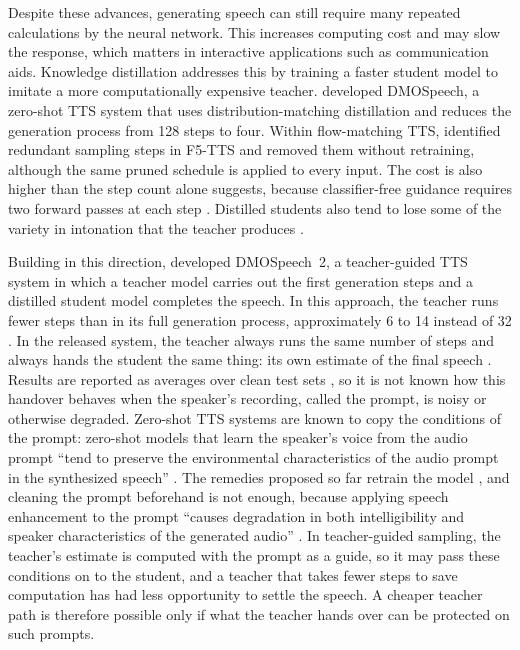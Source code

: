 Despite these advances, generating speech can still require many repeated calculations by the neural network. This increases computing cost and may slow the response, which matters in interactive applications such as communication aids. Knowledge distillation addresses this by training a faster student model to imitate a more computationally expensive teacher. \textcite{li2024dmospeech} developed DMOSpeech, a zero-shot TTS system that uses distribution-matching distillation and reduces the generation process from 128 steps to four. Within flow-matching TTS, \textcite{zheng2025epss} identified redundant sampling steps in F5-TTS and removed them without retraining, although the same pruned schedule is applied to every input. The cost is also higher than the step count alone suggests, because classifier-free guidance requires two forward passes at each step \parencite{ho2022cfg,yang2025shallow}. Distilled students also tend to lose some of the variety in intonation that the teacher produces \parencite[pp.~31817--31818]{li2025dmospeech2}.

Building in this direction, \textcite{li2025dmospeech2} developed DMOSpeech~2, a teacher-guided TTS system in which a teacher model carries out the first generation steps and a distilled student model completes the speech. In this approach, the teacher runs fewer steps than in its full generation process, approximately 6 to 14 instead of 32 \parencite[p.~31818]{li2025dmospeech2}. In the released system, the teacher always runs the same number of steps and always hands the student the same thing: its own estimate of the final speech \parencite{li2025dmospeech2code}. Results are reported as averages over clean test sets \parencite[p.~31819]{li2025dmospeech2}, so it is not known how this handover behaves when the speaker's recording, called the prompt, is noisy or otherwise degraded. Zero-shot TTS systems are known to copy the conditions of the prompt: zero-shot models that learn the speaker's voice from the audio prompt \enquote{tend to preserve the environmental characteristics of the audio prompt in the synthesized speech} \parencite[p.~1]{lu2026environment}. The remedies proposed so far retrain the model \parencite{lu2026environment,wang2024noise}, and cleaning the prompt beforehand is not enough, because applying speech enhancement to the prompt \enquote{causes degradation in both intelligibility and speaker characteristics of the generated audio} \parencite[p.~1]{wang2024noise}. In teacher-guided sampling, the teacher's estimate is computed with the prompt as a guide, so it may pass these conditions on to the student, and a teacher that takes fewer steps to save computation has had less opportunity to settle the speech. A cheaper teacher path is therefore possible only if what the teacher hands over can be protected on such prompts.

